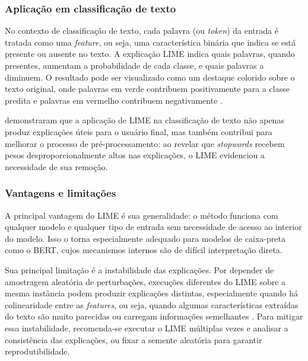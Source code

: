 \documentclass[
    12pt,                %
    openright,           %
    oneside,             %
    a4paper,             %
    english,             %
    brazil               %
]{abntex2}
\begin{document}
\subsubsection{Aplicação em classificação de texto}
\label{subsubsec:lime_texto}

No contexto de classificação de texto, cada palavra (ou \textit{token}) da entrada é tratada como uma \textit{feature}, ou seja, uma característica binária que indica se está presente ou ausente no texto. A explicação LIME indica quais palavras, quando presentes, aumentam a probabilidade de cada classe, e quais palavras a diminuem. O resultado pode ser visualizado como um destaque colorido sobre o texto original, onde palavras em verde contribuem positivamente para a classe predita e palavras em vermelho contribuem negativamente \cite{mustafa2025}.

 demonstraram que a aplicação de LIME na 
classificação de texto não apenas produz explicações úteis para o 
usuário final, mas também contribui para melhorar o processo de 
pré-processamento: ao revelar que \textit{stopwords} recebem pesos 
desproporcionalmente altos nas explicações, o LIME evidenciou a 
necessidade de sua remoção.

\subsubsection{Vantagens e limitações}
\label{subsubsec:lime_limitacoes}

A principal vantagem do LIME é sua generalidade: o método funciona com qualquer modelo e qualquer tipo de entrada sem necessidade de acesso ao interior do modelo. Isso o torna especialmente adequado para modelos de caixa-preta como o BERT, cujos mecanismos internos são de difícil interpretação direta.

Sua principal limitação é a instabilidade das explicações. Por 
depender de amostragem aleatória de perturbações, execuções diferentes 
do LIME sobre a mesma instância podem produzir explicações distintas, 
especialmente quando há colinearidade entre as \textit{features}, 
ou seja, quando algumas características extraídas do texto são muito 
parecidas ou carregam informações semelhantes \cite{salih2023}. Para 
mitigar essa instabilidade, recomenda-se executar o LIME múltiplas 
vezes e analisar a consistência das explicações, ou fixar a semente 
aleatória para garantir reprodutibilidade.
\end{document}
